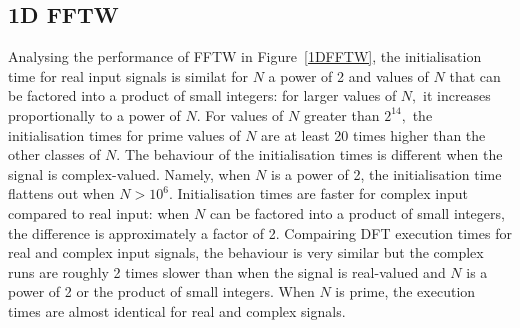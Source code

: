 \documentclass[12pt, a4paper]{article}
\begin{document}
\subsection{1D FFTW}
Analysing the performance of FFTW in Figure~\ref{1DFFTW}, the initialisation time for real input 
signals is similat for $N$ a power of 2 and values of $N$ that can be factored into a product of 
small integers: for larger values of $N,$ it increases proportionally to a power of $N.$ For 
values of $N$ greater than $2^{14},$ the initialisation times for prime values of $N$ are at 
least 20 times higher than the other classes of $N.$ The behaviour of the initialisation times 
is different when the signal is complex-valued. Namely, when $N$ is a power of 2, the initialisation 
time flattens out when $N>10^6.$ Initialisation times are faster for complex input compared to real 
input: when $N$ can be factored into a product of small integers, the difference is approximately a 
factor of 2. Compairing DFT execution times for real and complex input signals, the behaviour is very 
similar but the complex runs are roughly 2 times slower than when the signal is real-valued and $N$ 
is a power of 2 or the product of small integers. When $N$ is prime, the execution times are almost 
identical for real and complex signals. 
\end{document}
